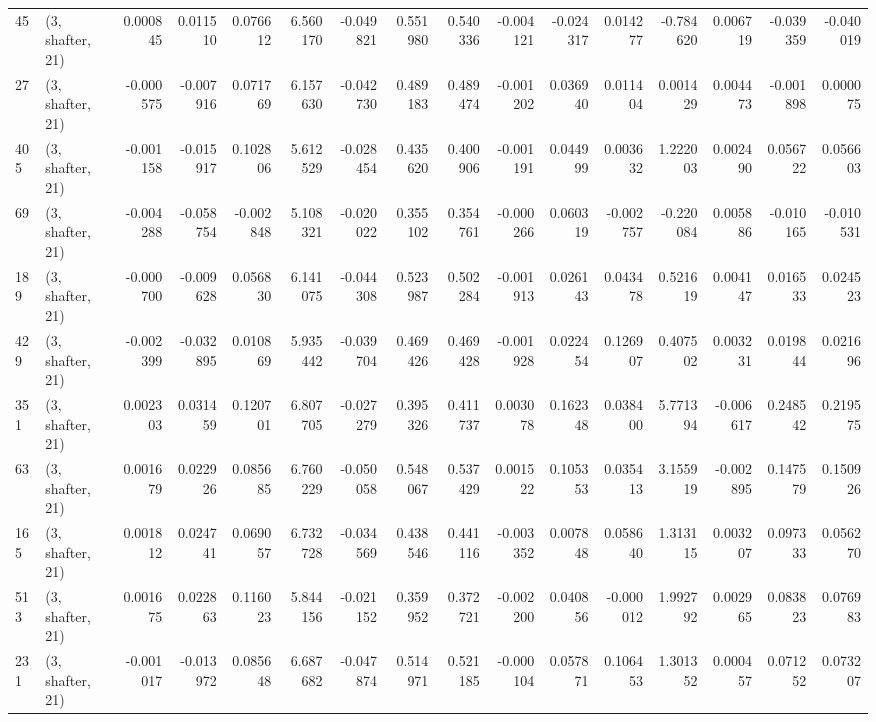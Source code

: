 \begin{tabular}{llrrrrrrrrrrrrrr}
45  &  (3, shafter, 21) &   0.000845 &  0.011510 &  0.076612 &    6.560170 & -0.049821 &   0.551980 &  0.540336 & -0.004121 & -0.024317 &  0.014277 &   -0.784620 &  0.006719 & -0.039359 & -0.040019 \\
27  &  (3, shafter, 21) &  -0.000575 & -0.007916 &  0.071769 &    6.157630 & -0.042730 &   0.489183 &  0.489474 & -0.001202 &  0.036940 &  0.011404 &    0.001429 &  0.004473 & -0.001898 &  0.000075 \\
405 &  (3, shafter, 21) &  -0.001158 & -0.015917 &  0.102806 &    5.612529 & -0.028454 &   0.435620 &  0.400906 & -0.001191 &  0.044999 &  0.003632 &    1.222003 &  0.002490 &  0.056722 &  0.056603 \\
69  &  (3, shafter, 21) &  -0.004288 & -0.058754 & -0.002848 &    5.108321 & -0.020022 &   0.355102 &  0.354761 & -0.000266 &  0.060319 & -0.002757 &   -0.220084 &  0.005886 & -0.010165 & -0.010531 \\
189 &  (3, shafter, 21) &  -0.000700 & -0.009628 &  0.056830 &    6.141075 & -0.044308 &   0.523987 &  0.502284 & -0.001913 &  0.026143 &  0.043478 &    0.521619 &  0.004147 &  0.016533 &  0.024523 \\
429 &  (3, shafter, 21) &  -0.002399 & -0.032895 &  0.010869 &    5.935442 & -0.039704 &   0.469426 &  0.469428 & -0.001928 &  0.022454 &  0.126907 &    0.407502 &  0.003231 &  0.019844 &  0.021696 \\
351 &  (3, shafter, 21) &   0.002303 &  0.031459 &  0.120701 &    6.807705 & -0.027279 &   0.395326 &  0.411737 &  0.003078 &  0.162348 &  0.038400 &    5.771394 & -0.006617 &  0.248542 &  0.219575 \\
63  &  (3, shafter, 21) &   0.001679 &  0.022926 &  0.085685 &    6.760229 & -0.050058 &   0.548067 &  0.537429 &  0.001522 &  0.105353 &  0.035413 &    3.155919 & -0.002895 &  0.147579 &  0.150926 \\
165 &  (3, shafter, 21) &   0.001812 &  0.024741 &  0.069057 &    6.732728 & -0.034569 &   0.438546 &  0.441116 & -0.003352 &  0.007848 &  0.058640 &    1.313115 &  0.003207 &  0.097333 &  0.056270 \\
513 &  (3, shafter, 21) &   0.001675 &  0.022863 &  0.116023 &    5.844156 & -0.021152 &   0.359952 &  0.372721 & -0.002200 &  0.040856 & -0.000012 &    1.992792 &  0.002965 &  0.083823 &  0.076983 \\
231 &  (3, shafter, 21) &  -0.001017 & -0.013972 &  0.085648 &    6.687682 & -0.047874 &   0.514971 &  0.521185 & -0.000104 &  0.057871 &  0.106453 &    1.301352 &  0.000457 &  0.071252 &  0.073207 \\

\end{tabular}
